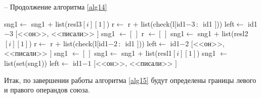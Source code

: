 \documentclass[main]{subfiles}
\begin{document}
\begin{algorithm}
	\caption{-- Продолжение алгоритма \ref{alg14}}\label{alg15}
	\begin{algorithmic}[1]
		
		\State sng1$\gets$ sng1 $+$ list(resl3$[i][1]$)
		\State r$\gets$ r $+$ list(check(l$[$id1$-3\, :\, $ id1 $]$))
		\EndIf
		\EndFor
		\State left$\gets$ id1$-3$
		\Else
		\State \Return $[$<<он>>, <<писали>> $]$
		\EndIf
		\EndIf
		\EndIf
		\State sng1 $\gets [\, ]$ 
		\State r $\gets [\, ]$
		\State sng1$\gets$ sng1 $+$ list(resl2$[i][1]$)
		\State r$\gets$ r $+$ list(check(l$[$id1$-2\, :\, $ id1 $]$))
		\EndIf
		\EndFor
		\State left$\gets$ id1$-2$
		\Else
		\State \Return $[$<<он>>, <<писали>> $]$
		\EndIf
		\EndIf
		\EndIf
		\State sng1 $\gets [\, ]$ 
		\State sng1$\gets$ sng1 + list(resl1$[i][1]$)
		\EndIf
		\EndFor
		\State sng1 $\gets$ list(set(sng1))
		\State left$\gets$ id1$-1$
			\Else
		\State \Return $[$<<он>>, <<писали>> $]$
			\EndIf
				\EndIf
	\end{algorithmic}
\end{algorithm}

\pagebreak
Итак, по завершении работы алгоритма \ref{alg15} будут определены границы левого и правого операндов союза.
\end{document}
